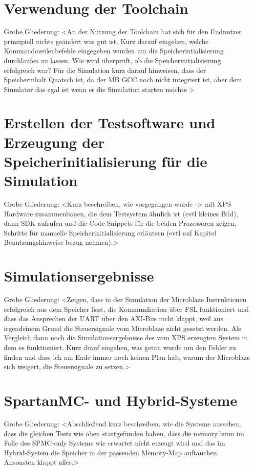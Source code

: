 \section{Verwendung der Toolchain}
Grobe Gliederung:
<An der Nutzung der Toolchain hat sich für den Endnutzer prinzipiell nichts geändert was gut ist. Kurz darauf eingehen, welche Kommandozeilenbefehle eingegeben wurden um die Speicherintialisierung durchlaufen zu lassen. Wie wird überprüft, ob die Speicherinitialisierung erfolgreich war? Für die Simulation kurz darauf hinweisen, dass der Speicherinhalt Quatsch ist, da der MB GCC noch nicht integriert ist, aber dem Simulator das egal ist wenn er die Simulation starten möchte >
\section{Erstellen der Testsoftware und Erzeugung der Speicherinitialisierung für die Simulation}
Grobe Gliederung:
<Kurz beschreiben, wie vorgegangen wurde -> mit XPS Hardware zusammenbauen, die dem Testsystem ähnlich ist (evtl kleines Bild), dann SDK aufrufen und die Code Snippets für die beiden Prozessoren zeigen, Schritte für manuelle Speicherinitialisierung erläutern (evtl auf Kapitel Benutzungshinweise bezug nehmen).>
\section{Simulationsergebnisse}
Grobe Gliederung:
<Zeigen, dass in der Simulation der Microblaze Instruktionen erfolgreich aus dem Speicher liest, die Kommunikation über FSL funktioniert und dass das Ansprechen der UART über den AXI-Bus nicht klappt, weil aus irgendeinem Grund die Steuersignale vom Microblaze nicht gesetzt werden. Als Vergleich dann noch die Simulationsergebnisse des vom XPS erzeugten System in dem es funktioniert. Kurz drauf eingehen, was getan wurde um den Fehler zu finden und dass ich am Ende immer noch keinen Plan hab, warum der Microblaze sich weigert, die Steuersignale zu setzen.>
\section{SpartanMC- und Hybrid-Systeme}
Grobe Gliederung:
<Abschließend kurz beschreiben, wie die Systeme aussehen, dass die gleichen Tests wie oben stattgefunden haben, dass die memory.bmm im Falle des SPMC-only Systems wie erwartet nicht erzeugt wird und das im Hybrid-System die Speicher in der passenden Memory-Map auftauchen. Ansonsten klappt alles.>